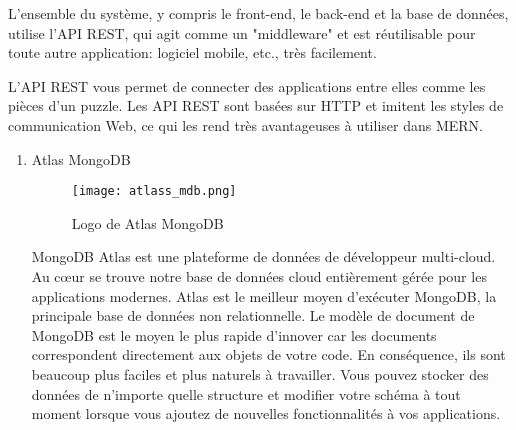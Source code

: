     L'ensemble du système, y compris le front-end, le back-end et la base de données, utilise l'API REST, qui agit comme un "middleware" et est réutilisable pour toute autre application: logiciel mobile, etc., très facilement.

    L'API REST vous permet de connecter des applications entre elles comme les pièces d'un puzzle. Les API REST sont basées sur HTTP et imitent les styles de communication Web, ce qui les rend très avantageuses à utiliser dans MERN.
    \begin{enumerate}\bfseries
        \item Atlas MongoDB\newline
        \begin{figure}[H]
            \centering
            \texttt{[image: atlass\_mdb.png]}
            \caption{Logo de Atlas MongoDB}\label{fig:atlass_mdb}
        \end{figure}
        \normalfont
        MongoDB Atlas est une plateforme de données de développeur multi-cloud. Au cœur se trouve notre base de données cloud entièrement gérée pour les applications modernes. Atlas est le meilleur moyen d'exécuter MongoDB, la principale base de données non relationnelle. Le modèle de document de MongoDB est le moyen le plus rapide d'innover car les documents correspondent directement aux objets de votre code. En conséquence, ils sont beaucoup plus faciles et plus naturels à travailler. Vous pouvez stocker des données de n'importe quelle structure et modifier votre schéma à tout moment lorsque vous ajoutez de nouvelles fonctionnalités à vos applications.


\end{enumerate}

